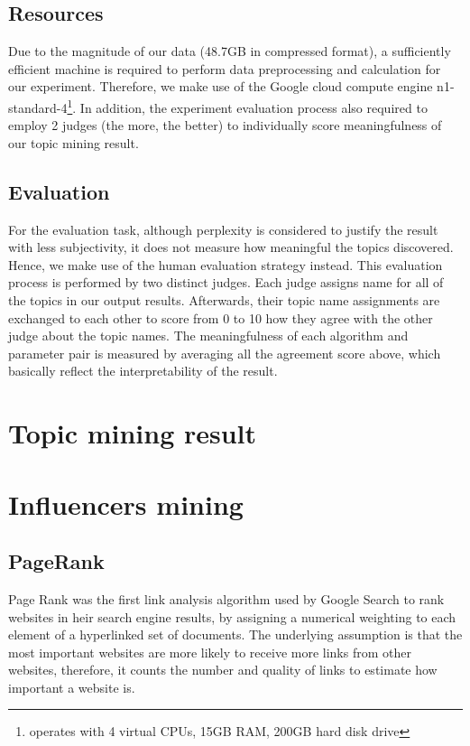 \documentclass[11pt]{article}
\begin{document}
\subsection{Resources} \label{resources}

Due to the magnitude of our data (48.7GB in compressed format), a sufficiently efficient machine is required to perform data preprocessing and calculation for our experiment. Therefore, we make use of the Google cloud compute engine n1-standard-4\footnote{operates with 4 virtual CPUs, 15GB RAM, 200GB hard disk drive}. In addition, the experiment evaluation process also required to employ 2 judges (the more, the better) to individually score meaningfulness of our topic mining result.

\subsection{Evaluation}

For the evaluation task, although perplexity is considered to justify the result with less subjectivity, it does not measure how meaningful the topics discovered. Hence, we make use of the human evaluation strategy\cite{zhao2011comparing} instead. This evaluation process is performed by two distinct judges. Each judge assigns name for all of the topics in our output results. Afterwards, their topic name assignments are exchanged to each other to score from 0 to 10 how they agree with the other judge about the topic names. The meaningfulness of each algorithm and parameter pair is measured by averaging all the agreement score above, which basically reflect the interpretability of the result.

\section{Topic mining result}

\section{Influencers mining}

\subsection{PageRank}
Page Rank was the first link analysis algorithm used by Google Search to rank websites in heir search engine results, by assigning a numerical weighting to each element of a hyperlinked set of documents. The underlying assumption is that the most important websites are more likely to receive more links from other websites, therefore, it counts the number and quality of links to estimate how important a website is.
\end{document}
